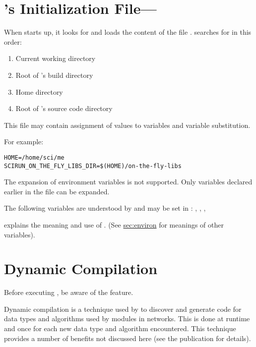 \section{\sr{}'s Initialization File---}
\label{sec:scirunrc}

When \sr{} starts up, it looks for and
loads the content of the file .  \sr{} searches for
 in this order:

\begin{enumerate}
\item Current working directory
\item Root of \sr's build directory
\item Home directory
\item Root of \sr's source code directory
\end{enumerate}

This file may contain assignment of values to variables and variable
substitution.

For example:

\begin{verbatim}
HOME=/home/sci/me
SCIRUN_ON_THE_FLY_LIBS_DIR=$(HOME)/on-the-fly-libs
\end{verbatim}

The expansion of environment variables is not supported.  Only
variables declared earlier in the file can be expanded.

The following variables are understood by \sr{} and may be set in
: ,
, ,

 explains the meaning and use
of . (See \hyperref{the
  previous section}{Section~}{}{sec:environ} for meanings of other
variables).

\section{Dynamic Compilation}
\label{sec:dyncomp}

Before executing \sr{},  be aware of the
 feature.

Dynamic compilation is a technique used by \sr{} to discover and
generate code for data types and algorithms used by modules in
networks.  This is done at runtime and once for each new
data type and algorithm encountered.  This technique provides a number
of benefits not discussed here (see the publication 
for details).


